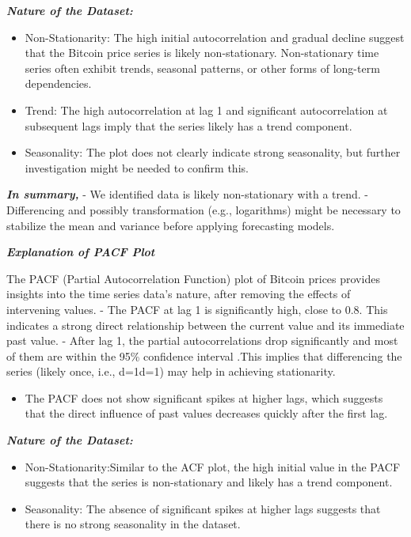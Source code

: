 \documentclass[
]{book}
\providecommand{\tightlist}{%
  \setlength{\itemsep}{0pt}\setlength{\parskip}{0pt}}
\begin{document}
\emph{\textbf{Nature of the Dataset:}}

\begin{itemize}
\tightlist
\item
  Non-Stationarity: The high initial autocorrelation and gradual decline suggest that the Bitcoin price series is likely non-stationary. Non-stationary time series often exhibit trends, seasonal patterns, or other forms of long-term dependencies.
\item
  Trend: The high autocorrelation at lag 1 and significant autocorrelation at subsequent lags imply that the series likely has a trend component.
\item
  Seasonality: The plot does not clearly indicate strong seasonality, but further investigation might be needed to confirm this.
\end{itemize}

\emph{\textbf{In summary,}}
- We identified data is likely non-stationary with a trend.
- Differencing and possibly transformation (e.g., logarithms) might be necessary to stabilize the mean and variance before applying forecasting models.

\emph{\textbf{Explanation of PACF Plot}}

The PACF (Partial Autocorrelation Function) plot of Bitcoin prices provides insights into the time series data's nature, after removing the effects of intervening values.
- The PACF at lag 1 is significantly high, close to 0.8. This indicates a strong direct relationship between the current value and its immediate past value.
- After lag 1, the partial autocorrelations drop significantly and most of them are within the 95\% confidence interval .This implies that differencing the series (likely once, i.e., d=1d=1) may help in achieving stationarity.

\begin{itemize}
\tightlist
\item
  The PACF does not show significant spikes at higher lags, which suggests that the direct influence of past values decreases quickly after the first lag.
\end{itemize}

\emph{\textbf{Nature of the Dataset:}}

\begin{itemize}
\item
  Non-Stationarity:Similar to the ACF plot, the high initial value in the PACF suggests that the series is non-stationary and likely has a trend component.
\item
  Seasonality: The absence of significant spikes at higher lags suggests that there is no strong seasonality in the dataset.
\end{itemize}
\end{document}
